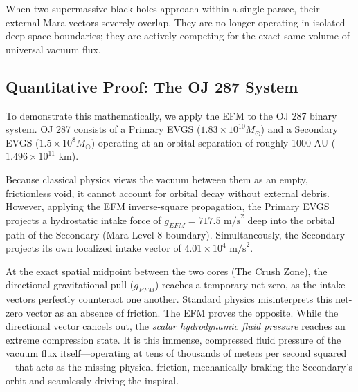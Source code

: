 \documentclass[11pt, a4paper]{article}
\begin{document}
When two supermassive black holes approach within a single parsec, their external Mara vectors severely overlap. They are no longer operating in isolated deep-space boundaries; they are actively competing for the exact same volume of universal vacuum flux. 

\subsection{Quantitative Proof: The OJ 287 System}
To demonstrate this mathematically, we apply the EFM to the OJ 287 binary system. OJ 287 consists of a Primary EVGS ($1.83 \times 10^{10} M_{\odot}$) and a Secondary EVGS ($1.5 \times 10^8 M_{\odot}$) operating at an orbital separation of roughly 1000 AU ($1.496 \times 10^{11}$ km).

Because classical physics views the vacuum between them as an empty, frictionless void, it cannot account for orbital decay without external debris. However, applying the EFM inverse-square propagation, the Primary EVGS projects a hydrostatic intake force of $g_{EFM} = 717.5 \text{ m/s}^2$ deep into the orbital path of the Secondary (Mara Level 8 boundary). Simultaneously, the Secondary projects its own localized intake vector of $4.01 \times 10^4 \text{ m/s}^2$. 

At the exact spatial midpoint between the two cores (The Crush Zone), the directional gravitational pull ($g_{EFM}$) reaches a temporary net-zero, as the intake vectors perfectly counteract one another. Standard physics misinterprets this net-zero vector as an absence of friction. The EFM proves the opposite. While the directional vector cancels out, the \textit{scalar hydrodynamic fluid pressure} reaches an extreme compression state. It is this immense, compressed fluid pressure of the vacuum flux itself—operating at tens of thousands of meters per second squared—that acts as the missing physical friction, mechanically braking the Secondary's orbit and seamlessly driving the inspiral.
\end{document}
